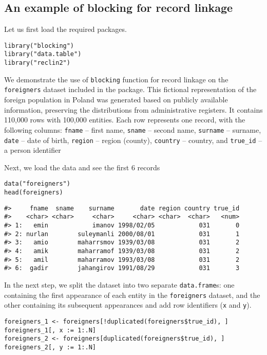 \subsection{An example of blocking for record linkage}\label{an-example-of-blocking-for-record-linkage}

Let us first load the required packages.

\begin{verbatim}
library("blocking")
library("data.table")
library("reclin2")
\end{verbatim}

We demonstrate the use of \texttt{blocking} function for record linkage on the
\texttt{foreigners} dataset included in the package. This fictional
representation of the foreign population in Poland was generated based
on publicly available information, preserving the distributions from
administrative registers. It contains 110,000 rows with 100,000
entities. Each row represents one record, with the following columns:
\texttt{fname} -- first name, \texttt{sname} -- second name, \texttt{surname} -- surname,
\texttt{date} -- date of birth, \texttt{region} -- region (county), \texttt{country} -- country, and
\texttt{true\_id} -- a person identifier

Next, we load the data and see the first 6 records

\begin{verbatim}
data("foreigners")
head(foreigners)
\end{verbatim}

\begin{verbatim}
#>     fname  sname    surname       date region country true_id
#>    <char> <char>     <char>     <char> <char>  <char>   <num>
#> 1:   emin            imanov 1998/02/05            031       0
#> 2: nurlan        suleymanli 2000/08/01            031       1
#> 3:   amio        maharrsmov 1939/03/08            031       2
#> 4:   amik        maharramof 1939/03/08            031       2
#> 5:   amil        maharramov 1993/03/08            031       2
#> 6:  gadir        jahangirov 1991/08/29            031       3
\end{verbatim}

In the next step, we split the dataset into two separate \texttt{data.frame}s: one containing the first
appearance of each entity in the \texttt{foreigners} dataset, and the other
containing its subsequent appearances and add row identifiers (\texttt{x} and \texttt{y}).

\begin{verbatim}
foreigners_1 <- foreigners[!duplicated(foreigners$true_id), ]
foreigners_1[, x := 1:.N]
foreigners_2 <- foreigners[duplicated(foreigners$true_id), ]
foreigners_2[, y := 1:.N]
\end{verbatim}

